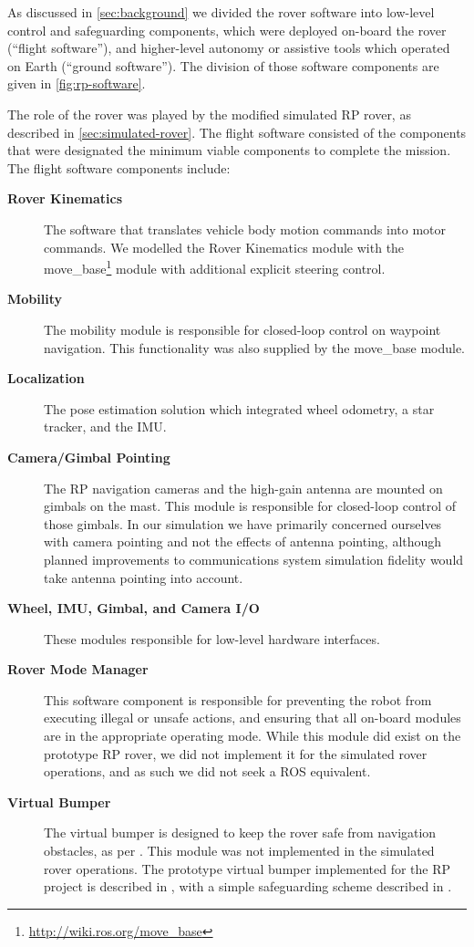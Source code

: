\documentclass[twocolumn,letterpaper]{IEEEAerospaceCLS}  %
\begin{document}
As discussed in \cref{sec:background} we divided the rover software into low-level control and safeguarding components, which were deployed on-board the rover (``flight software''), and higher-level autonomy or assistive tools which operated on Earth (``ground software'').  
The division of those software components are given in \cref{fig:rp-software}.   

The role of the rover was played by the modified simulated RP rover, as described in \cref{sec:simulated-rover}.  The flight software consisted of the components that were designated the minimum viable components to complete the mission.  The flight software components include:

\begin{description}
\item[\textbf{Rover Kinematics}] The software that translates vehicle body motion commands into motor commands.  We modelled the Rover Kinematics module with the move\_base\footnote{\url{http://wiki.ros.org/move_base}} module with additional explicit steering control.
\item[\textbf{Mobility}] The mobility module is responsible for closed-loop control on waypoint navigation.  This functionality was also supplied by the move\_base module. 
\item[\textbf{Localization}]  The pose estimation solution which integrated wheel odometry, a star tracker, and the IMU.  
\item[\textbf{Camera/Gimbal Pointing}] The RP navigation cameras and the high-gain antenna are mounted on gimbals on the mast.
This module is responsible for closed-loop control of those gimbals.  
In our simulation we have primarily concerned ourselves with camera pointing and not the effects of antenna pointing, although planned improvements to communications system simulation fidelity would take antenna pointing into account.  
\item[\textbf{Wheel, IMU, Gimbal, and Camera I/O}]  These modules responsible for low-level hardware interfaces.  
\item[\textbf{Rover Mode Manager}] This software component is responsible for preventing the robot from executing illegal or unsafe actions, and ensuring that all on-board modules are in the appropriate operating mode.  
While this module did exist on the prototype RP rover, we did not implement it for the simulated rover operations, and as such we did not seek a ROS equivalent.
\item[\textbf{Virtual Bumper}]  The virtual bumper is designed to keep the rover safe from navigation obstacles, as per \cite{matthies1997fast}. 
This module was not implemented in the simulated rover operations. 
The prototype virtual bumper implemented for the RP project is described in \cite{nefian2017structured}, with a simple safeguarding scheme described in \cite{furlong2016safeguarding}.
\end{description}
\end{document}
